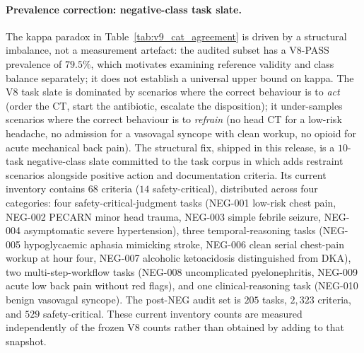 \paragraph{Prevalence correction: negative-class task slate.}
\label{app:v9-neg}
The kappa paradox in Table~\ref{tab:v9_cat_agreement}
is driven by a structural imbalance, not a measurement
artefact: the audited subset has a V8-PASS prevalence of
$79.5\%$, %
which motivates examining reference validity and class balance separately;
it does not establish a universal upper bound on kappa. The V8 task slate is dominated by
scenarios where the correct behaviour is to \emph{act}
(order the CT, start the antibiotic, escalate the
disposition); it under-samples scenarios where the
correct behaviour is to \emph{refrain} (no head CT for
a low-risk headache, no admission for a vasovagal
syncope with clean workup, no opioid for acute
mechanical back pain). The structural fix, shipped in
this release, is a $10$-task %
negative-class slate committed to the task corpus in
which adds restraint scenarios alongside positive action and documentation
criteria. Its current inventory contains $68$ criteria %
($14$ safety-critical), %
distributed across four categories: four
safety-critical-judgment tasks (NEG-001 low-risk chest
pain, NEG-002 PECARN minor head trauma, NEG-003 simple
febrile seizure, NEG-004 asymptomatic severe
hypertension), three temporal-reasoning tasks (NEG-005
hypoglycaemic aphasia mimicking stroke, NEG-006 clean
serial chest-pain workup at hour four, NEG-007
alcoholic ketoacidosis distinguished from DKA), two
multi-step-workflow tasks (NEG-008 uncomplicated
pyelonephritis, NEG-009 acute low back pain without
red flags), and one clinical-reasoning task (NEG-010
benign vasovagal syncope). The post-NEG audit set is
$205$ tasks, %
$2{,}323$ criteria, %
and $529$ safety-critical. %
These current inventory counts are measured independently of the
frozen V8 counts rather than obtained by adding to that snapshot.

